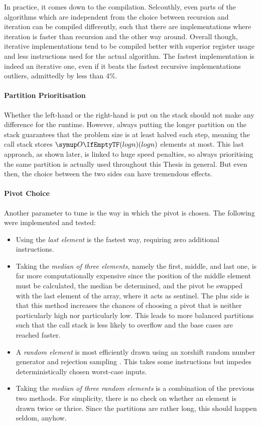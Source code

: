 In practice, it comes down to the compilation.
Selcouthly, even parts of the algorithms which are independent from the choice between recursion and iteration can be compiled differently, such that there are implementations where iteration is faster than recursion and the other way around.
Overall though, iterative implementations tend to be compiled better with superior register usage and less instructions used for the actual \QS{} algorithm.
The fastest implementation is indeed an iterative one, even if it beats the fastest recursive implementations \Dash outliers, admittedly \Dash by less than 4\%.


\paragraph{Partition Prioritisation}
Whether the left-hand or the right-hand is put on the stack should not make any difference for the runtime.
However, always putting the longer partition on the stack guarantees that the problem size is at least halved each step, meaning the call stack stores \(\bigoh{log n}\) elements at most.
This last approach, as shown later, is linked to huge speed penalties, so always prioritising the same partition is actually used throughout this Thesis in general.
But even then, the choice between the two sides can have tremendous effects.


\paragraph{Pivot Choice}
Another parameter to tune is the way in which the pivot is chosen.
The following were implemented and tested:
\begin{itemize}
	\item
	Using the \emph{last element} is the fastest way, requiring zero additional instructions.

	\item
	Taking the \emph{median of three elements}, namely the first, middle, and last one, is far more computationally expensive since the position of the middle element must be calculated, the median be determined, and the pivot be swapped with the last element of the array, where it acts as sentinel.
	The plus side is that this method increases the chances of choosing a pivot that is neither particularly high nor particularly low.
	This leads to more balanced partitions such that the call stack is less likely to overflow and the base cases are reached faster.

	\item
	A \emph{random element} is most efficiently drawn using an xorshift random number generator and rejection sampling \cite{lukas_geis}.
	This takes some instructions but impedes deterministically chosen worst-case inputs.

	\item
	Taking the \emph{median of three random elements} is a combination of the previous two methods.
	For simplicity, there is no check on whether an element is drawn twice or thrice.
	Since the partitions are rather long, this should happen seldom, anyhow.
\end{itemize}



